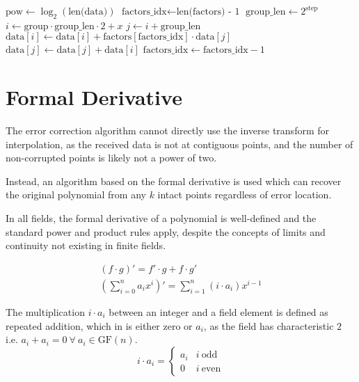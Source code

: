 \begin{algorithm}
    \begin{algorithmic}
            \State $\text{pow} \gets \log_2(\text{len(data)})$
            \State $\text{factors\_idx} \gets \text{len(factors) - 1}$
                \State $\text{group\_len} \gets 2^\text{step}$
                        \State $i \gets \text{group} \cdot \text{group\_len} \cdot 2 + x$
                        \State $j \gets i + \text{group\_len}$
                        \State $\text{data}[i] \gets \text{data}[i] + \text{factors}[\text{factors\_idx}] \cdot \text{data}[j]$
                        \State $\text{data}[j] \gets \text{data}[j] + \text{data}[i]$
                    \EndFor
                    \State $\text{factors\_idx} \gets \text{factors\_idx} - 1$
                \EndFor
            \EndFor
        \EndFunction
    \end{algorithmic}
\end{algorithm}

\section{Formal Derivative}

The error correction algorithm cannot directly use the inverse transform for interpolation, as the received data is not at contiguous points, and the number of non-corrupted points is likely not a power of two.

Instead, an algorithm based on the formal derivative is used which can recover the original polynomial from any $k$ intact points regardless of error location.

In all fields, the formal derivative of a polynomial is well-defined and the standard power and product rules apply, despite the concepts of limits and continuity not existing in finite fields.

\begin{gather*}
(f \cdot g)' = f' \cdot g + f \cdot g'\\
(\sum_{i = 0}^{n} a_i x^i)' = \sum_{i = 1}^{n} (i \cdot a_i) x^{i - 1}
\end{gather*}

The multiplication $i \cdot a_i$ between an integer and a field element is defined as repeated addition, which in  is either zero or $a_i$, as the field has characteristic $2$ i.e. $a_i + a_i = 0\ \forall\ a_i \in \text{GF}(n)$.
\[
i \cdot a_i =
    \begin{cases}
        a_i & i\ \text{odd} \\
        0 & i\ \text{even}
    \end{cases}
\]

